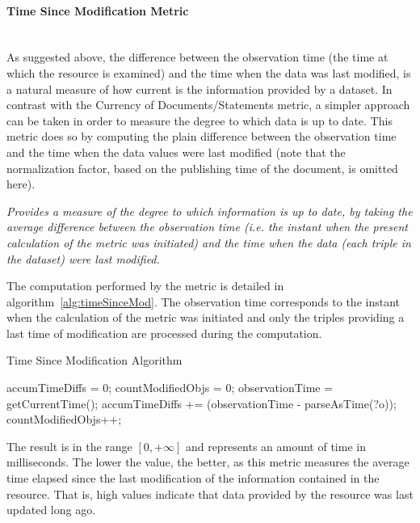 \paragraph{Time Since Modification Metric}~\\ %
As suggested above, the difference between the observation time (the time at which the resource is examined) and the time when the data was last modified, is a natural measure of how current is the information provided by a dataset. In contrast with the Currency of Documents/Statements metric, a simpler approach can be taken in order to measure the degree to which data is up to date. This metric does so by computing the plain difference between the observation time and the time when the data values were last modified (note that the normalization factor, based on the publishing time of the document, is omitted here).
\begin{mdframed}[style=metricdefinition]
\emph{Provides a measure of the degree to which information is up to date, by taking the average difference between the observation time (i.e. the instant when the present calculation of the metric was initiated) and the time when the data (each triple in the dataset) were last modified.}
\end{mdframed}

The computation performed by the metric is detailed in algorithm~\ref{alg:timeSinceMod}. The observation time corresponds to the instant when the calculation of the metric was initiated and only the triples providing a last time of modification are processed during the computation.
\begin{algorithm}
\caption{Time Since Modification Algorithm} \label{alg:timeSinceMod}
\begin{algorithmic}[1]
\State accumTimeDiffs = 0;
\State countModifiedObjs = 0;
\State observationTime = getCurrentTime();
\EndProcedure
{}
\State accumTimeDiffs += (observationTime - parseAsTime(?o));
\State countModifiedObjs++;
\EndIf ~\\
\EndProcedure
\end{algorithmic}
\end{algorithm}
The result is in the range $[0, +\infty]$ and represents an amount of time in milliseconds. The lower the value, the better, as this metric measures the average time elapsed since the last modification of the information contained in the resource. That is, high values indicate that data provided by the resource was last updated long ago.

